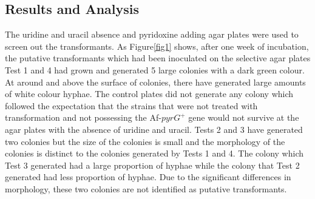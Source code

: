 \documentclass[a4paper,10pt]{article}
\begin{document}
\begin{multicols}{2}


\section{Results and Analysis}





The uridine and uracil absence and pyridoxine adding agar plates were used to screen out the transformants. As Figure\ref{fig1} shows, after one week of incubation, the putative transformants which had been inoculated on the selective agar plates Test 1 and 4 had grown and generated 5 large colonies with a dark green colour. At around and above the surface of colonies, there have generated large amounts of white colour hyphae. The control plates did not generate any colony which followed the expectation that the strains that were not treated with transformation and not possessing the Af-$pyrG^+$ gene would not survive at the agar plates with the absence of uridine and uracil. Tests 2 and 3 have generated two colonies but the size of the colonies is small and the morphology of the colonies is distinct to the colonies generated by Tests 1 and 4. The colony which Test 3 generated had a large proportion of hyphae while the colony that Test 2 generated had less proportion of hyphae. Due to the significant differences in morphology, these two colonies are not identified as putative transformants.



\end{multicols}
\end{document}
